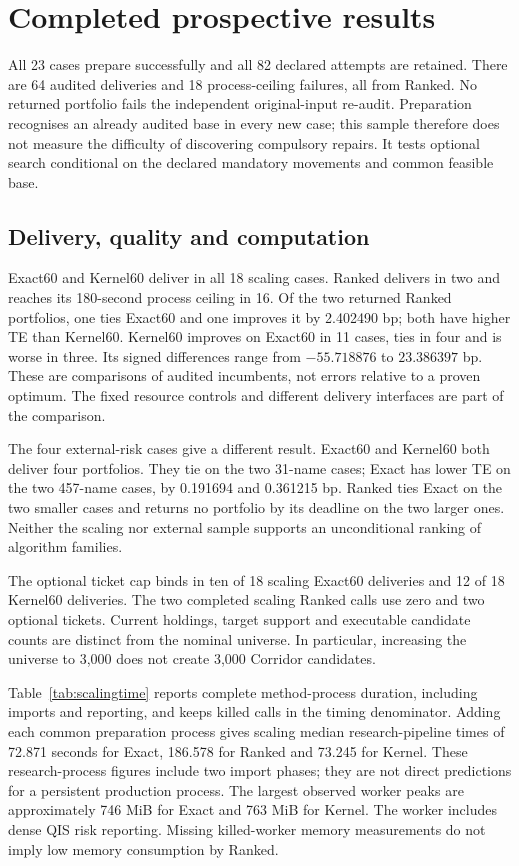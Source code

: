 \documentclass[11pt]{article}
\begin{document}
\section{Completed prospective results}
All 23 cases prepare successfully and all 82 declared attempts are retained.
There are 64 audited deliveries and 18 process-ceiling failures, all from
Ranked. No returned portfolio fails the independent original-input re-audit.
Preparation recognises an already audited base in every new case; this sample
therefore does not measure the difficulty of discovering compulsory repairs.
It tests optional search conditional on the declared mandatory movements and
common feasible base.

\subsection{Delivery, quality and computation}
Exact60 and Kernel60 deliver in all 18 scaling cases. Ranked delivers in two
and reaches its 180-second process ceiling in 16. Of the two returned Ranked
portfolios, one ties Exact60 and one improves it by 2.402490 bp; both have
higher TE than Kernel60. Kernel60 improves on Exact60 in 11 cases, ties in
four and is worse in three. Its signed differences range from $-55.718876$
to $23.386397$ bp. These are comparisons of audited incumbents, not errors
relative to a proven optimum. The fixed resource controls and different
delivery interfaces are part of the comparison.



The four external-risk cases give a different result. Exact60 and Kernel60
both deliver four portfolios. They tie on the two 31-name cases; Exact has
lower TE on the two 457-name cases, by 0.191694 and 0.361215 bp. Ranked ties
Exact on the two smaller cases and returns no portfolio by its deadline on
the two larger ones. Neither the scaling nor external sample supports an
unconditional ranking of algorithm families.

The optional ticket cap binds in ten of 18 scaling Exact60 deliveries and
12 of 18 Kernel60 deliveries. The two completed scaling Ranked calls use
zero and two optional tickets. Current holdings, target support and executable
candidate counts are distinct from the nominal universe. In particular,
increasing the universe to 3,000 does not create 3,000 Corridor candidates.

Table~\ref{tab:scalingtime} reports complete method-process duration, including
imports and reporting, and keeps killed calls in the timing denominator.
Adding each common preparation process gives scaling median research-pipeline
times of 72.871 seconds for Exact, 186.578 for Ranked and 73.245 for Kernel.
These research-process figures include two import phases; they are not direct
predictions for a persistent production process. The largest observed worker
peaks are approximately 746 MiB for Exact and 763 MiB for Kernel. The worker
includes dense QIS risk reporting. Missing killed-worker memory measurements
do not imply low memory consumption by Ranked.
\end{document}

